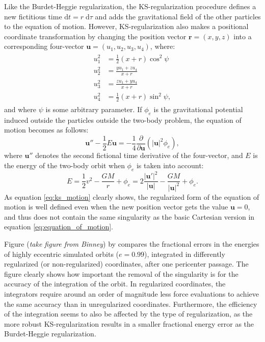 \documentclass[english, oneside]{HYgradu}
\begin{document}
Like the Burdet-Heggie regularization, the KS-regularization procedure defines a new fictitious time $\mathrm{d}t = r \; \mathrm{d}\tau$ and adds the gravitational field of the other particles to the equation of motion. However, KS-regularization also makes a positional coordinate transformation by changing the position vector $\mathbf{r} = (x, y, z)$ into a corresponding four-vector $\mathbf{u} = (u_1, u_2, u_3, u_4)$, where:
\begin{align}
\begin{split}
u_1^2& = \frac{1}{2}(x+r)\cos^2\psi \\
u_2^2& = \frac{yu_1+zu_4}{x+r} \\
u_3^2& = \frac{zu_1+yu_4}{x+r} \\
u_4^2& = \frac{1}{2}(x+r)\sin^2\psi,
\end{split}
\end{align}
and where $\psi$ is some arbitrary parameter. If $\phi_e$ is the gravitational potential induced outside the particles outside the two-body problem, the equation of motion becomes as follows:
\begin{equation}
\mathbf{u}'' - \frac{1}{2} E \mathbf{u} = -\frac{1}{4} \frac{\partial}{\partial\mathbf{u}} \left( |\mathbf{u}|^2 \phi_e \right), \label{eq:ks_motion}
\end{equation} 
where $\mathbf{u}''$ denotes the second fictional time derivative of the four-vector, and $E$ is the energy of the two-body orbit when $\phi_e$ is taken into account:
\begin{equation}
E = \frac{1}{2}v^2 - \frac{GM}{r} + \phi_e = 2 \frac{|\mathbf{u'}|^2}{|\mathbf{u}|} - \frac{GM}{|\mathbf{u}|^2} + \phi_e.
\end{equation}
As equation \ref{eq:ks_motion} clearly shows, the regularized form of the equation of motion is well defined even when the new position vector gets the value $\mathbf{u} = 0$, and thus does not contain the same singularity as the basic Cartesian version in equation \ref{eq:equation_of_motion}.

Figure (\textit{take figure from Binney}) by \cite{BinneyTremaine} compares the fractional errors in the energies of highly eccentric simulated orbits ($e = 0.99$), integrated in differently regularized (or non-regularized) coordinates, after one pericenter passage. The figure clearly shows how important the removal of the singularity is for the accuracy of the integration of the orbit. In regularized coordinates, the integrators require around an order of magnitude less force evaluations to achieve the same accuracy than in unregularized coordinates. Furthermore, the efficiency of the integration seems to also be affected by the type of regularization, as the more robust KS-regularization results in a smaller fractional energy error as the Burdet-Heggie regularization.
\end{document}
